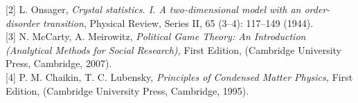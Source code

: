 \documentclass[portrait, a0b,final]{a0poster}%
\numberwithin{equation}{section}
\newenvironment{poster}{
  \begin{center}
  \begin{minipage}[c]{0.98\textwidth}
}{
  \end{minipage}
  \end{center}
}
\newenvironment{pcolumn}[1]{
  \begin{minipage}{#1\textwidth}
  \begin{center}
}{
  \end{center}
  \end{minipage}
}
\begin{document}
\begin{poster}
\begin{center}
\begin{pcolumn}{0.32}
{[2] L. Onsager, {\it Crystal statistics. I. A two-dimensional model with an order-disorder transition}, Physical Review, Series II, 65 (3–4): 117–149 (1944).\\

[3] N. McCarty, A. Meirowitz, {\it Political Game Theory: An Introduction (Analytical Methods for Social Research),} First Edition, (Cambridge University Press, Cambridge, 2007).\\

[4] P. M. Chaikin,  T. C. Lubensky, {\it Principles of Condensed Matter Physics,} First Edition, (Cambridge University Press, Cambridge, 1995).

}
\end{pcolumn}
\end{center}




\end{poster}
\end{document}
